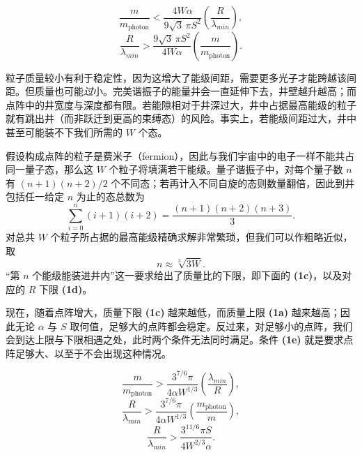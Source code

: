 \begin{keybox}
\begin{equation}
\frac{m}{m_{\mathrm{photon}}}<\frac{4W\alpha}{9\sqrt{3}\,\pi S^{2}}\left(\frac{R}{\lambda_{min}}\right),\tag{1a}
\end{equation}
\begin{equation}
\frac{R}{\lambda_{min}}>\frac{9\sqrt{3}\,\pi S^{2}}{4W\alpha}\left(\frac{m}{m_{\mathrm{photon}}}\right).\tag{1b}
\end{equation}
\end{keybox}

粒子质量较小有利于稳定性，因为这增大了能级间距，需要更多光子才能跨越该间距。但质量也可能\emph{过}小。完美谐振子的能量井会一直延伸下去，井壁越升越高；而点阵中的井宽度与深度都有限。若能隙相对于井深过大，井中占据最高能级的粒子就有跳出井（而非跃迁到更高的束缚态）的风险。事实上，若能级间距过大，井中甚至可能装不下我们所需的 $W$ 个态。

假设构成点阵的粒子是费米子（fermion），因此与我们宇宙中的电子一样不能共占同一量子态，那么这 $W$ 个粒子将填满若干能级。量子谐振子中，对每个量子数 $n$ 有 $(n+1)(n+2)/2$ 个不同态；若再计入不同自旋的态则数量翻倍，因此到并包括任一给定 $n$ 为止的态总数为
\begin{equation}
\sum_{i=0}^{n}(i+1)(i+2)=\frac{(n+1)(n+2)(n+3)}{3}.
\end{equation}
对总共 $W$ 个粒子所占据的最高能级精确求解非常繁琐，但我们可以作粗略近似，取
\begin{equation}
n\approx \sqrt[3]{3W}.
\end{equation}
“第 $n$ 个能级能装进井内”这一要求给出了质量比的下限，即下面的 \textbf{(1c)}，以及对应的 $R$ 下限 \textbf{(1d)}。

现在，随着点阵增大，质量下限 \textbf{(1c)} 越来越低，而质量上限 \textbf{(1a)} 越来越高；因此无论 $\alpha$ 与 $S$ 取何值，足够大的点阵都会稳定。反过来，对足够小的点阵，我们会到达上限与下限相遇之处，此时两个条件无法同时满足。条件 \textbf{(1e)} 就是要求点阵足够大、以至于不会出现这种情况。

\begin{keybox}
\begin{equation}
\frac{m}{m_{\mathrm{photon}}}>\frac{3^{7/6}\pi}{4\alpha W^{1/3}}\left(\frac{\lambda_{min}}{R}\right),\tag{1c}
\end{equation}
\begin{equation}
\frac{R}{\lambda_{min}}>\frac{3^{7/6}\pi}{4\alpha W^{1/3}}\left(\frac{m_{\mathrm{photon}}}{m}\right),\tag{1d}
\end{equation}
\begin{equation}
\frac{R}{\lambda_{min}}>\frac{3^{11/6}\pi S}{4W^{2/3}\alpha}.\tag{1e}
\end{equation}
\end{keybox}

